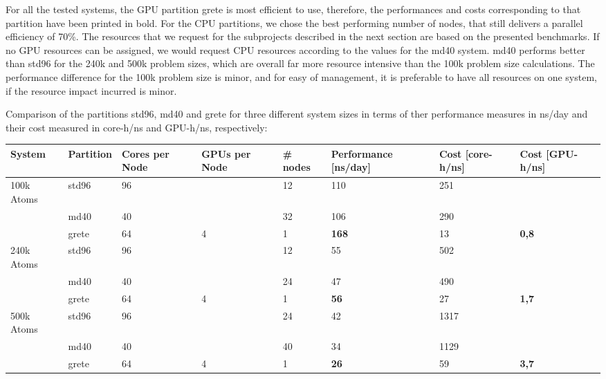 \documentclass[new,showhints]{nhrproposal}
\begin{document}
\BenchmarkDiscussion
For all the tested systems, the GPU partition grete is most efficient to use, therefore, the performances and costs corresponding to that partition have been printed in bold. For the CPU partitions, we chose the best performing number of nodes, that still delivers a parallel efficiency of 70\%. The resources that we request for the subprojects described in the next section are based on the presented benchmarks. If no GPU resources can be assigned, we would request CPU resources according to the values for the md40 system. md40 performs better than std96 for the 240k and 500k problem sizes, which are overall far more resource intensive than the 100k problem size calculations. The performance difference for the 100k problem size is minor, and for easy of management, it is preferable to have all resources on one system, if the resource impact incurred is minor. 

Comparison of the partitions std96, md40 and grete for three different system sizes in terms of ther performance measures in ns/day and their cost measured in core-h/ns and GPU-h/ns, respectively:
\begin{center}
  \begin{tabular}{l|p{1.5cm}p{1.0cm}p{1.0cm}p{1.5cm}p{2.5cm}|p{2cm}|p{2cm}}
  System &Partition &Cores per Node &GPUs per Node &\# nodes & Performance [ns/day] &Cost [core-h/ns] &Cost [GPU-h/ns] \\ \hline
  100k Atoms &std96 &96  & & 12 &110 &251 & \\
  & md40 & 40 & & 32 & 106 & 290 & \\
    & grete & 64 &4 &1 &\textbf{168} &13 &\textbf{0,8} \\\hline
  240k Atoms &std96 &96 & &12 &55 &502 \\
  &md40 &40 &&24 &47 &490 &\\
    &  grete &64 &4 &1 &\textbf{56} &27 &\textbf{1,7}\\ \hline
  500k Atoms &std96 &96  & &24 &42 &1317 & \\
    &    md40 &40& &40 &34 &1129 & \\
    &grete &64 &4 &1 &\textbf{26} &59 &\textbf{3,7}
\end{tabular}
\end{center}
\end{document}
